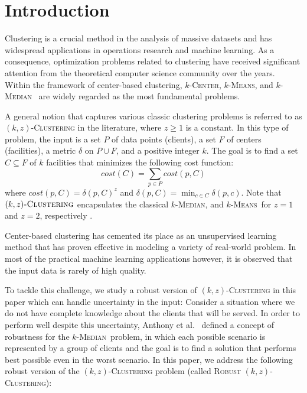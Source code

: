 \documentclass[11pt]{article}
\newcommand{\kzc}{\textsc{$(k,z)$-Clustering}\xspace}
\newcommand{\rkc}{\textsc{Robust $(k,z)$-Clustering}\xspace}
\newcommand{\kms}{\textsc{$k$-Means}}
\newcommand{\kmd}{\textsc{$k$-Median}}
\newcommand{\kcen}{\textsc{$k$-Center}}
\begin{document}


\section{Introduction}\label{sec:introduction}

 
Clustering is a crucial method in the analysis of massive datasets and has widespread applications in operations research and machine learning. As a consequence, optimization problems related to clustering have received significant attention from the theoretical computer science community over the years. Within the framework of center-based clustering, \kcen , \kms, and \kmd ~\cite{HS85,JV01,BPRST17,AhmadianNSW17,kanungo2004local} are widely regarded as the most fundamental problems. 

A general notion that captures various classic clustering problems is referred to as \kzc in the literature, where $z\ge 1$ is a constant. In this type of problem, the input is a set $P$ of data points (clients), a set $F$ of centers (facilities), a metric $\delta$ on $P \cup F$, and a positive integer $k$. The goal is to find a set $C\subseteq F$ of $k$ facilities that minimizes the following cost function:
\begin{equation*}
    cost(C)=\sum_{p\in P}cost(p,C)
\end{equation*}
where $cost(p,C)=\delta(p,C)^z$ and $\delta(p,C)=\min_{c\in C} \delta(p,c)$. Note that $\kzc$ encapsulates the classical \kmd, and \kms~for $z=1$ and $z=2$, respectively .

Center-based clustering has cemented its place as an unsupervised learning method that has proven effective in modeling a variety of real-world problem. In most of the practical machine learning applications however, it is observed that the input data is rarely of high quality.

To tackle this challenge, we study a robust version of \kzc in this paper which can handle uncertainty in the input: Consider a situation where we do not have complete knowledge about the clients that will be served. In order to perform well despite this uncertainty, Anthony et al.~\cite{AGGN10} defined a concept of robustness for the \kmd~problem, in which each possible scenario is represented by a group of clients and the goal is to find a solution that performs best possible even in the worst scenario. In this paper, we address the following robust version of the \kzc problem (called \rkc): \\ 
\end{document}
